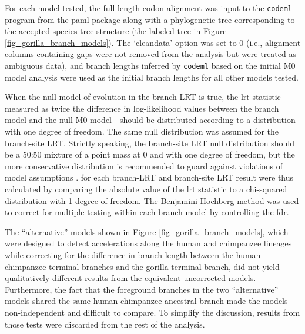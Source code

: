 For each model tested, the full length codon alignment was input to
the \texttt{codeml} program from the \ac{paml} package along with a
phylogenetic tree corresponding to the accepted species tree structure
(the labeled tree in Figure \ref{fig_gorilla_branch_models}). The
`cleandata' option was set to 0 (i.e., alignment columns containing
gaps were not removed from the analysis but were treated as ambiguous
data), and branch lengths inferred by \texttt{codeml} based on the
initial M0 model analysis were used as the initial branch lengths for
all other models tested.

When the null model of evolution in the branch-LRT is true, the
\ac{lrt} statistic---measured as twice the difference in
log-likelihood values between the branch model and the null M0
model---should be distributed according to a \chisq distribution with
one degree of freedom. The same null distribution was assumed for the
branch-site LRT. Strictly speaking, the branch-site LRT null
distribution should be a 50:50 mixture of a point mass at 0 and \chisq
with one degree of freedom, but the more conservative \chisq
distribution is recommended to guard against violations of model
assumptions \citep{Yang2007}. \pvs for each branch-LRT and branch-site
LRT result were thus calculated by comparing the absolute value of the
\ac{lrt} statistic to a chi-squared distribution with 1 degree of
freedom. The Benjamini-Hochberg method \citep{Benjamini1995} was used
to correct for multiple testing within each branch model by
controlling the \ac{fdr}.

The ``alternative'' models shown in Figure
\ref{fig_gorilla_branch_models}, which were designed to detect
accelerations along the human and chimpanzee lineages while correcting
for the difference in branch length between the human-chimpanzee
terminal branches and the gorilla terminal branch, did not yield
qualitatively different results from the equivalent uncorrected
models. Furthermore, the fact that the foreground branches in the two
``alternative'' models shared the same human-chimpanzee ancestral
branch made the models non-independent and difficult to compare. To
simplify the discussion, results from those tests were discarded from
the rest of the analysis.


